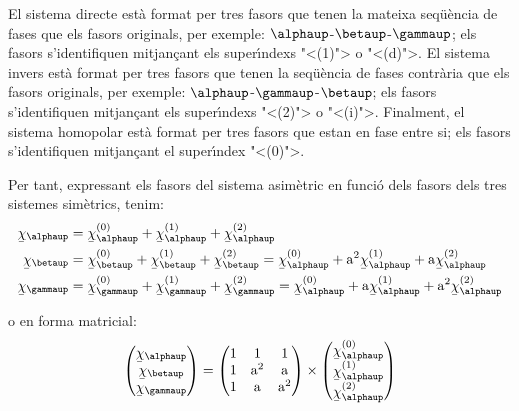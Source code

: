  
 El sistema directe est\`{a} format per tres
fasors que tenen la mateixa seq\"{u}\`{e}ncia de fases que els fasors
originals, per exemple: $\alphaup$-$\betaup$-$\gammaup$; els fasors
s'identifiquen mitjan\c{c}ant els super\'{\i}ndexs {"<}(1){">} o {"<}(d){">}. El sistema
invers est\`{a} format per tres fasors que tenen la seq\"{u}\`{e}ncia de fases contr\`{a}ria
 que els fasors originals, per exemple:
$\alphaup$-$\gammaup$-$\betaup$; els fasors s'identifiquen mitjan\c{c}ant els
super\'{\i}ndexs {"<}(2){">} o {"<}(i){">}. Finalment, el sistema homopolar est\`{a}
format per tres fasors que estan en fase entre si; els fasors
s'identifiquen mitjan\c{c}ant el super\'{\i}ndex {"<}(0){">}.

Per tant, expressant els fasors del sistema asim\`{e}tric en funci\'{o}
dels fasors dels tres sistemes sim\`{e}trics, tenim:
\begin{subequations}
\begin{align}
   \cmplx{\chi}_\alphaup &= \cmplx{\chi}_\alphaup\ap{(0)}  +
   \cmplx{\chi}_\alphaup\ap{(1)} + \cmplx{\chi}_\alphaup\ap{(2)} \label{eq:c_sim_a}\\
   \cmplx{\chi}_\betaup &= \cmplx{\chi}_\betaup\ap{(0)} + \cmplx{\chi}_\betaup\ap{(1)} +
   \cmplx{\chi}_\betaup\ap{(2)}  =  \cmplx{\chi}_\alphaup\ap{(0)} + \au^2
   \cmplx{\chi}_\alphaup\ap{(1)} + \au \cmplx{\chi}_\alphaup\ap{(2)} \label{eq:c_sim_b}\\
   \cmplx{\chi}_\gammaup &= \cmplx{\chi}_\gammaup\ap{(0)} + \cmplx{\chi}_\gammaup\ap{(1)} +
   \cmplx{\chi}_\gammaup\ap{(2)}  = \cmplx{\chi}_\alphaup\ap{(0)} + \au
   \cmplx{\chi}_\alphaup\ap{(1)} + \au^2 \cmplx{\chi}_\alphaup\ap{(2)} \label{eq:c_sim_c}
\end{align}
\end{subequations}

o en forma matricial:
\begin{equation}
   \begin{pmatrix}
     \cmplx{\chi}_\alphaup \\
     \cmplx{\chi}_\betaup \\
     \cmplx{\chi}_\gammaup
   \end{pmatrix} =
   \begin{pmatrix}
     1 & 1 & 1 \\
     1 & \au^2 & \au\\
     1 & \au & \au^2
   \end{pmatrix} \times
   \begin{pmatrix}
     \cmplx{\chi}_\alphaup\ap{(0)} \\
     \cmplx{\chi}_\alphaup\ap{(1)} \\
     \cmplx{\chi}_\alphaup\ap{(2)}
   \end{pmatrix}
\end{equation}

